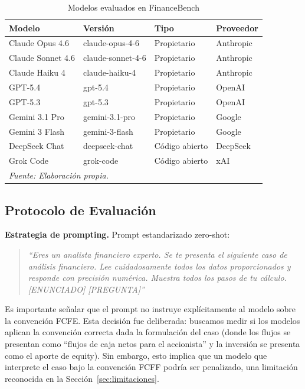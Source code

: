\documentclass[12pt,a4paper]{article}
\begin{document}
\begin{table}[ht]
\centering
\caption{Modelos evaluados en FinanceBench}
\label{tab:modelos}
\begin{tabularx}{\linewidth}{lllX}
\toprule
\textbf{Modelo} & \textbf{Versión} & \textbf{Tipo} & \textbf{Proveedor} \\
\midrule
Claude Opus 4.6  & claude-opus-4-6   & Propietario    & Anthropic \\
Claude Sonnet 4.6 & claude-sonnet-4-6 & Propietario   & Anthropic \\
Claude Haiku 4   & claude-haiku-4    & Propietario    & Anthropic \\
GPT-5.4          & gpt-5.4           & Propietario    & OpenAI    \\
GPT-5.3          & gpt-5.3           & Propietario    & OpenAI    \\
Gemini 3.1 Pro   & gemini-3.1-pro    & Propietario    & Google    \\
Gemini 3 Flash   & gemini-3-flash    & Propietario    & Google    \\
DeepSeek Chat    & deepseek-chat     & Código abierto & DeepSeek  \\
Grok Code        & grok-code         & Código abierto & xAI       \\
\bottomrule
\multicolumn{4}{l}{\footnotesize\textit{Fuente: Elaboración propia.}}
\end{tabularx}
\end{table}

\subsection{Protocolo de Evaluación}

\textbf{Estrategia de prompting.} Prompt estandarizado zero-shot:

\begin{quote}
\textit{``Eres un analista financiero experto. Se te presenta el siguiente caso de análisis financiero. Lee cuidadosamente todos los datos proporcionados y responde con precisión numérica. Muestra todos los pasos de tu cálculo. [ENUNCIADO] [PREGUNTA]''}
\end{quote}

Es importante señalar que el prompt no instruye explícitamente al modelo sobre la convención FCFE. Esta decisión fue deliberada: buscamos medir si los modelos aplican la convención correcta dada la formulación del caso (donde los flujos se presentan como ``flujos de caja netos para el accionista'' y la inversión se presenta como el aporte de equity). Sin embargo, esto implica que un modelo que interprete el caso bajo la convención FCFF podría ser penalizado, una limitación reconocida en la Sección~\ref{sec:limitaciones}.
\end{document}
